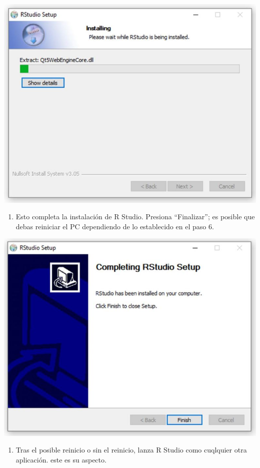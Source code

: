 \documentclass[
]{book}
\providecommand{\tightlist}{%
  \setlength{\itemsep}{0pt}\setlength{\parskip}{0pt}}
\begin{document}
\includegraphics{data/R09.png}

\begin{enumerate}
\def\labelenumi{\arabic{enumi}.}
\setcounter{enumi}{9}
\tightlist
\item
  Esto completa la instalación de R Studio. Presiona ``Finalizar''; es posible que debas reiniciar el PC dependiendo de lo establecido en el paso 6.
\end{enumerate}

\includegraphics{data/R10.png}

\begin{enumerate}
\def\labelenumi{\arabic{enumi}.}
\setcounter{enumi}{10}
\tightlist
\item
  Tras el posible reinicio o sin el reinicio, lanza R Studio como cuqlquier otra aplicación. este es su aspecto.
\end{enumerate}
\end{document}
